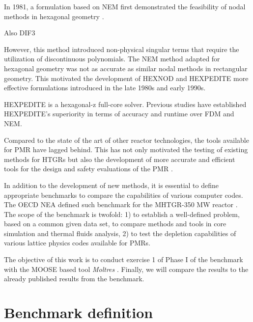\documentclass{anstrans}
\begin{document}
In 1981, a formulation based on \gls{NEM} first demonstrated the feasibility of nodal methods in hexagonal geometry \cite{duracz_nodal_1981}.

Also DIF3 \cite{lawrence_dif3d_1983}

However, this method introduced non-physical singular terms that require the utilization of discontinuous polynomials.
The \gls{NEM} method adapted for hexagonal geometry was not as accurate as similar nodal methods in rectangular geometry.
This motivated the development of HEXNOD \cite{wagner_three-dimensional_1989} and HEXPEDITE \cite{fitzpatrick_developments_1995} more effective formulations introduced in the late 1980s and early 1990s.

HEXPEDITE is a hexagonal-z full-core solver.
Previous studies \cite{} have established HEXPEDITE's superiority in terms of accuracy and runtime over \gls{FDM} and \gls{NEM}.

\cite{ortensi_deterministic_2010}



Compared to the state of the art of other reactor technologies, the tools available for \gls{PMR} have lagged behind.
This has not only motivated the testing of existing methods for \glspl{HTGR} but also the development of more accurate and efficient tools for the design and safety evaluations of the \gls{PMR} \cite{oecd_nea_benchmark_2017}.

In addition to the development of new methods, it is essential to define appropriate benchmarks to compare the capabilities of various computer codes.
The \gls{OECD} \gls{NEA} defined such benchmark for the \gls{MHTGR}-350 MW reactor \cite{oecd_nea_benchmark_2017}.
The scope of the benchmark is twofold: 1) to establish a well-defined problem, based on a common given data set, to compare methods and tools in core simulation and thermal fluids analysis, 2) to test the depletion capabilities of various lattice physics codes available for \glspl{PMR}.

The objective of this work is to conduct exercise 1 of Phase I of the benchmark with the \gls{MOOSE} \cite{gaston_physics-based_2015} based tool \textit{Moltres} \cite{lindsay_introduction_2018}.
Finally, we will compare the results to the already published results from the benchmark.

\section{Benchmark definition}
\end{document}
